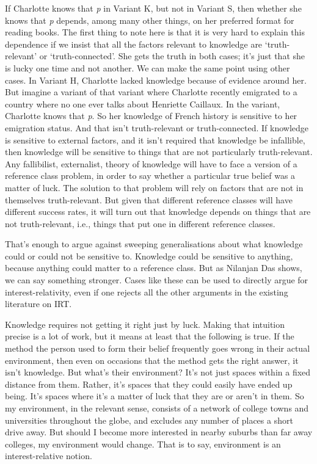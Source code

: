 \documentclass[
  11pt,
]{book}
\begin{document}
If Charlotte knows that \emph{p} in Variant K, but not in Variant S, then whether she knows that \emph{p} depends, among many other things, on her preferred format for reading books. The first thing to note here is that it is very hard to explain this dependence if we insist that all the factors relevant to knowledge are `truth-relevant' or `truth-connected'. She gets the truth in both cases; it's just that she is lucky one time and not another. We can make the same point using other cases. In Variant H, Charlotte lacked knowledge because of evidence around her. But imagine a variant of that variant where Charlotte recently emigrated to a country where no one ever talks about Henriette Caillaux. In the variant, Charlotte knows that \emph{p}. So her knowledge of French history is sensitive to her emigration status. And that isn't truth-relevant or truth-connected. If knowledge is sensitive to external factors, and it isn't required that knowledge be infallible, then knowledge will be sensitive to things that are not particularly truth-relevant. Any fallibilist, externalist, theory of knowledge will have to face a version of a reference class problem, in order to say whether a particular true belief was a matter of luck. The solution to that problem will rely on factors that are not in themselves truth-relevant. But given that different reference classes will have different success rates, it will turn out that knowledge depends on things that are not truth-relevant, i.e., things that put one in different reference classes.

That's enough to argue against sweeping generalisations about what knowledge could or could not be sensitive to. Knowledge could be sensitive to anything, because anything could matter to a reference class. But as Nilanjan Das \citeyearpar[ 116]{DasThesis} shows, we can say something stronger. Cases like these can be used to directly argue for interest-relativity, even if one rejects all the other arguments in the existing literature on IRT.

Knowledge requires not getting it right just by luck. Making that intuition precise is a lot of work, but it means at least that the following is true. If the method the person used to form their belief frequently goes wrong in their actual environment, then even on occasions that the method gets the right answer, it isn't knowledge. But what's their environment? It's not just spaces within a fixed distance from them. Rather, it's spaces that they could easily have ended up being. It's spaces where it's a matter of luck that they are or aren't in them. So my environment, in the relevant sense, consists of a network of college towns and universities throughout the globe, and excludes any number of places a short drive away. But should I become more interested in nearby suburbs than far away colleges, my environment would change. That is to say, environment is an interest-relative notion.
\end{document}

